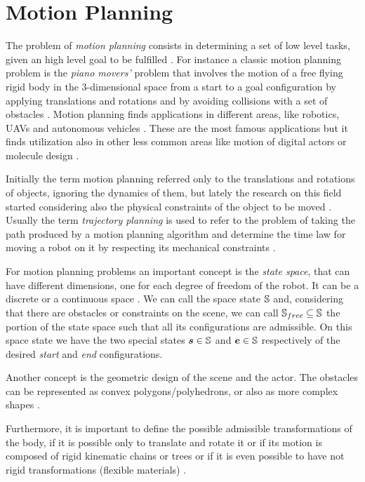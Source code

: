 \documentclass[dissertation.tex]{subfiles}
\begin{document}
\chapter{Motion Planning}
The problem of \emph{motion planning} consists in determining a set of
low level tasks, given an high level goal to be fulfilled
\cite{choset}. For instance a classic motion planning problem is the
\emph{piano movers'} problem that involves the motion of a free flying rigid 
body in the 3-dimensional space
 from a start to a goal configuration by applying
translations and rotations and by avoiding collisions with a set
of obstacles \cite{choset}\cite{lavalle}. Motion planning finds
applications in 
different areas, like robotics, \acp{UAV} \cite{goerzen} and autonomous
vehicles \cite{paden}. These are the most
famous applications but it finds utilization also in other less
common areas like motion of digital actors or molecule design
\cite{choset}.

Initially the term motion planning referred only to the translations
and rotations of objects, ignoring the dynamics of them, but lately
the research on this field started considering also the physical
constraints of the object to be moved \cite{lavalle}. Usually the term
\emph{trajectory planning} is used to refer to the problem of taking
the path produced by a
motion planning algorithm and determine the time law for moving a
robot on it by
respecting its mechanical constraints \cite{lavalle}.

For motion planning problems an important concept is the \emph{state
  space},
that can have different dimensions, one for each degree of freedom of
the robot. It can be a discrete or a continuous space
\cite{lavalle}. We can call the space state $\mathbb{S}$
and, considering that there are obstacles or constraints on the scene,
we can call $\mathbb{S}_{free}\subseteq\mathbb{S}$
the portion of the state space such that all its configurations
are admissible. On this space state we have
the two special states $\boldsymbol{s}\in\mathbb{S}$ and $\boldsymbol{e}\in\mathbb{S}$ respectively of the
desired \emph{start} and \emph{end} configurations.

Another concept is the geometric design of the scene and the
actor. The obstacles can be represented as convex
polygons/polyhedrons, or also as more complex
shapes \cite{lavalle}.

Furthermore, it is important to define the possible admissible
transformations of the body, if it is 
possible only to translate and rotate it or if its motion is composed of
rigid kinematic chains or trees or if it is even possible to have not
rigid transformations (flexible materials) \cite{lavalle}.
\end{document}
